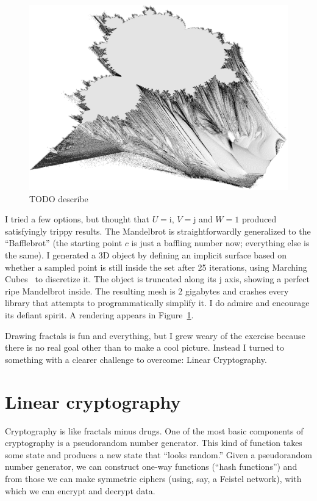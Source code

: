 \documentclass[twocolumn]{article}
\begin{document}
\begin{figure}[htp]
  \includegraphics[width=0.95 \linewidth]{bafflebrot}
  \caption{
    TODO describe
  } \label{fig:bafflebrot}
\end{figure}

I tried a few options, but thought that $U = \textrm{i}$, $V =
\textrm{j}$ and $W = 1$ produced satisfyingly trippy results. The
Mandelbrot is straightforwardly generalized to the ``Bafflebrot'' (the
starting point $c$ is just a baffling number now; everything else is
the same). I generated a 3D object by defining an implicit surface
based on whether a sampled point is still inside the set after 25
iterations, using Marching Cubes~\cite{lorensen1987marching} to
discretize it. The object is truncated along its $\textrm{j}$ axis,
showing a perfect ripe Mandelbrot inside. The resulting mesh is 2
gigabytes and crashes every library that attempts to programmatically
simplify it. I do admire and encourage its defiant spirit. A
rendering appears in Figure~\ref{fig:bafflebrot}.

\medskip
Drawing fractals is fun and everything, but I grew weary of the
exercise because there is no real goal other than to make a cool
picture. Instead I turned to something with a clearer challenge to
overcome: Linear Cryptography.

\section{Linear cryptography}
Cryptography is like fractals minus drugs. One of the most basic
components of cryptography is a pseudorandom number generator. This
kind of function takes some state and produces a new state that
``looks random.'' Given a pseudorandom number generator, we can
construct one-way functions (``hash functions'') and from those we can
make symmetric ciphers (using, say, a Feistel network), with which we
can encrypt and decrypt data.
\end{document}
